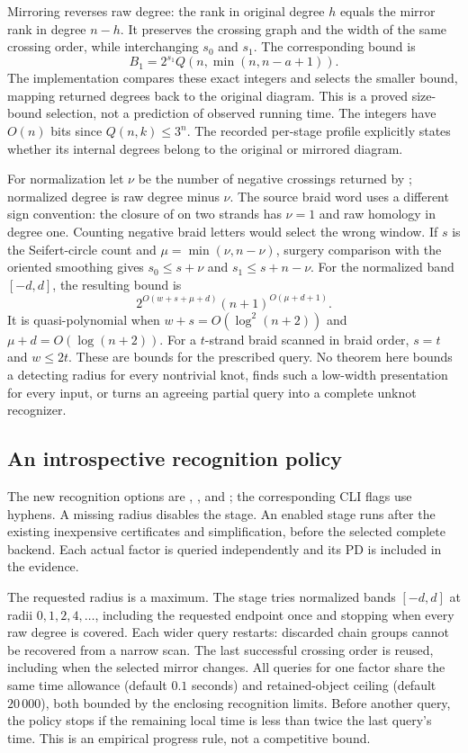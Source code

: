 Mirroring reverses raw degree: the rank in original degree $h$ equals the
mirror rank in degree $n-h$. It preserves the crossing graph and the width
of the same crossing order, while interchanging $s_0$ and $s_1$.
The corresponding bound is
\[
 B_1=2^{s_1}Q(n,\min(n,n-a+1)).
\]
The implementation compares these exact integers and selects the smaller
bound, mapping returned degrees back to the original diagram. This is a
proved size-bound selection, not a prediction of observed running time.
The integers have $O(n)$ bits since $Q(n,k)\leq3^n$.
The recorded per-stage profile explicitly states whether its internal
degrees belong to the original or mirrored diagram.

For normalization let $\nu$ be the number of negative crossings returned
by ; normalized degree is raw degree minus $\nu$.
The source braid word uses a different sign convention: the closure of
\code{[1]} on two strands has $\nu=1$ and raw homology in degree one.
Counting negative braid letters would select the wrong window.
If $s$ is the Seifert-circle count and $\mu=\min(\nu,n-\nu)$, surgery
comparison with the oriented smoothing gives
$s_0\leq s+\nu$ and $s_1\leq s+n-\nu$.
For the normalized band $[-d,d]$, the resulting bound is
\begin{equation}\label{eq:integrated-window-complexity}
 2^{O(w+s+\mu+d)}(n+1)^{O(\mu+d+1)}.
\end{equation}
It is quasi-polynomial when $w+s=O(\log^2(n+2))$ and
$\mu+d=O(\log(n+2))$. For a $t$-strand braid scanned in braid order,
$s=t$ and $w\leq2t$. These are bounds for the prescribed query.
No theorem here bounds a detecting radius for every nontrivial knot,
finds such a low-width presentation for every input, or turns an agreeing
partial query into a complete unknot recognizer.

\subsection{An introspective recognition policy}
The new recognition options are ,
, and ; the corresponding
CLI flags use hyphens. A missing radius disables the stage. An enabled
stage runs after the existing inexpensive certificates and simplification,
before the selected complete backend. Each actual factor is queried
independently and its PD is included in the evidence.

The requested radius is a maximum. The stage tries normalized bands
$[-d,d]$ at radii $0,1,2,4,\ldots$, including the requested endpoint
once and stopping when every raw degree is covered. Each wider query
restarts: discarded chain groups cannot be recovered from a narrow scan.
The last successful crossing order is reused, including when the selected
mirror changes. All queries for one factor share the same time allowance
(default $0.1$ seconds) and retained-object ceiling (default $20\,000$),
both bounded by the enclosing recognition limits. Before another query,
the policy stops if the remaining local time is less than twice the last
query's time. This is an empirical progress rule, not a competitive bound.

